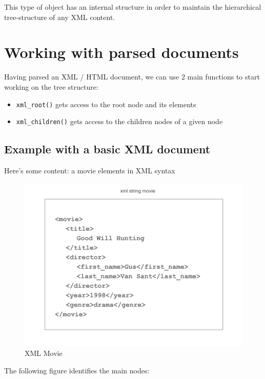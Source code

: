 \documentclass[
]{book}
\begin{document}
This type of object has an internal structure in order to maintain the
hierarchical tree-structure of any XML content.

\hypertarget{working-with-parsed-documents}{%
\section{Working with parsed documents}\label{working-with-parsed-documents}}

Having parsed an XML / HTML document, we can use 2 main functions to start
working on the tree structure:

\begin{itemize}
\item
  \texttt{xml\_root()} gets access to the root node and its elements
\item
  \texttt{xml\_children()} gets access to the children nodes of a given node
\end{itemize}

\hypertarget{example-with-a-basic-xml-document}{%
\subsection{Example with a basic XML document}\label{example-with-a-basic-xml-document}}

Here's some content: a movie elements in XML syntax

\begin{figure}

{\centering \includegraphics[width=0.7\linewidth]{images/xml/xml-movie1} 

}

\caption{XML Movie}\label{fig:unnamed-chunk-22}
\end{figure}

The following figure identifies the main nodes:
\end{document}
